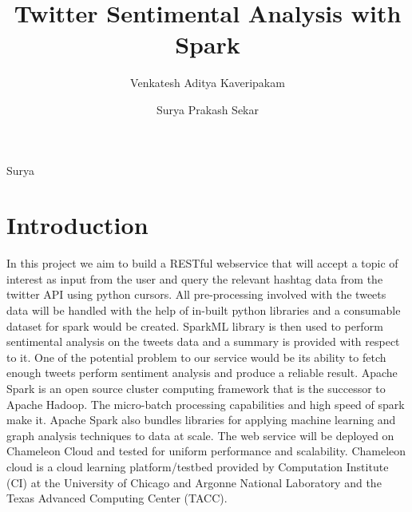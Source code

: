 
\title{Twitter Sentimental Analysis with Spark}


\author{Venkatesh Aditya Kaveripakam}

\author{Surya Prakash Sekar}

\renewcommand{\shortauthors}{Aditya}{Surya}


\begin{abstract}

\end{abstract}



\maketitle

\section{Introduction}
In this project we aim to build a RESTful webservice that will accept a topic
of interest as input from the user and query the relevant hashtag data from
the twitter API using python cursors. All pre-processing involved with the
tweets data will be handled with the help of in-built python libraries and a
consumable dataset for spark would be created. SparkML library is then used
to perform sentimental analysis on the tweets data and a summary is provided
with respect to it. One of the potential problem to our service would be its
ability to fetch enough tweets perform sentiment analysis and produce a
reliable result.
Apache Spark is an open source cluster computing framework that is the
successor to Apache Hadoop. The micro-batch processing capabilities and high
speed of spark make it. Apache Spark also bundles libraries for applying
machine learning and graph analysis techniques to data at scale.
The web service will be deployed on Chameleon Cloud and tested for uniform
performance and scalability. Chameleon cloud is a cloud learning
platform/testbed provided by Computation Institute (CI) at the University of
Chicago and Argonne National Laboratory and the Texas Advanced Computing
Center (TACC).



 
